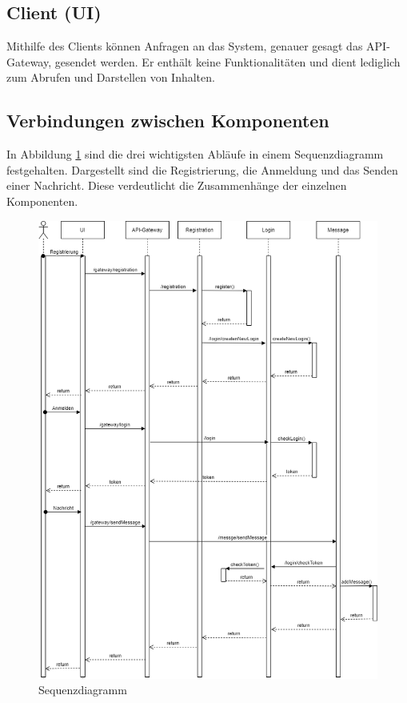 \subsection{Client (UI)}
Mithilfe des Clients können Anfragen an das System, genauer gesagt das API-Gateway, gesendet werden. Er enthält keine Funktionalitäten und dient lediglich zum Abrufen und Darstellen von Inhalten.

\subsection{Verbindungen zwischen Komponenten}
In Abbildung \ref{sequenz} sind die drei wichtigsten Abläufe in einem Sequenzdiagramm festgehalten. Dargestellt sind die Registrierung, die Anmeldung und das Senden einer Nachricht. Diese verdeutlicht die Zusammenhänge der einzelnen Komponenten.\newpage
\begin{figure}[bth] 
	\centering
	\includegraphics[width=1.0\textwidth]{Graphics/test2.png}
	\caption{Sequenzdiagramm}
	\label{sequenz}
\end{figure}

